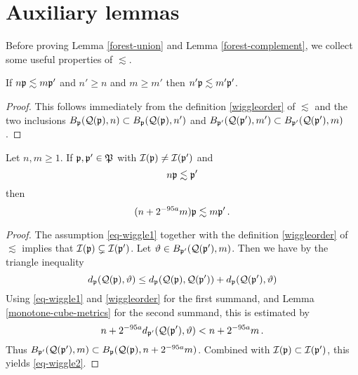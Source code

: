 {\section{Auxiliary lemmas}
\label{subsec-lessim-aux}
Before proving Lemma \ref{forest-union} and Lemma \ref{forest-complement}, we collect some useful properties of $\lesssim$.

\begin{lemma}
    \label{wiggle-order-1}

    If $n{\mathfrak p} \lesssim m{\mathfrak p}'$ and
    $n' \ge  n$ and $m \ge m'$ then $n'{\mathfrak p} \lesssim m'{\mathfrak p}'$.
\end{lemma}

\begin{proof}
    This follows immediately from the definition \eqref{wiggleorder} of $\lesssim$ and the two inclusions $B_{{\mathfrak p}}({\mathcal{Q}}({\mathfrak p}), n) \subset B_{{\mathfrak p}}({\mathcal{Q}}({\mathfrak p}), n')$ and $B_{{\mathfrak p}'}({\mathcal{Q}}({\mathfrak p}'), m') \subset B_{{\mathfrak p}'}({\mathcal{Q}}({\mathfrak p}'), m)$.
\end{proof}

\begin{lemma}
    \label{wiggle-order-2}

    Let $n, m \ge 1$.
    If ${\mathfrak p}, {\mathfrak p}' \in {\mathfrak P}$ with ${\mathcal{I}}({\mathfrak p}) \ne {\mathcal{I}}({\mathfrak p}')$ and
    \begin{equation}
        \label{eq-wiggle1}
        n {\mathfrak p} \lesssim {\mathfrak p}'
    \end{equation}
    then
    \begin{equation}
        \label{eq-wiggle2}
        (n + 2^{-95 a} m) {\mathfrak p} \lesssim m{\mathfrak p}'\,.
    \end{equation}
\end{lemma}

\begin{proof}
    The assumption \eqref{eq-wiggle1} together with the definition \eqref{wiggleorder} of $\lesssim$ implies that ${\mathcal{I}}({\mathfrak p}) \subsetneq {\mathcal{I}}({\mathfrak p}')$. Let ${\vartheta} \in B_{{\mathfrak p}'}({\mathcal{Q}}({\mathfrak p}'), m)$.  Then we have by the triangle inequality
    $$
        d_{{\mathfrak p}}({\mathcal{Q}}({\mathfrak p}), {\vartheta}) \le  d_{{\mathfrak p}}({\mathcal{Q}}({\mathfrak p}), {\mathcal{Q}}({\mathfrak p}')) +  d_{{\mathfrak p}}({\mathcal{Q}}({\mathfrak p}'), {\vartheta})
    $$
    Using \eqref{eq-wiggle1} and \eqref{wiggleorder} for the first summand, and Lemma \ref{monotone-cube-metrics} for the second summand, this is estimated by
    $$
        n + 2^{-95a} d_{{\mathfrak p}'}({\mathcal{Q}}({\mathfrak p}'), {\vartheta}) < n + 2^{-95a} m\,.
    $$
    Thus $B_{{\mathfrak p}'}({\mathcal{Q}}({\mathfrak p}'),m) \subset B_{{\mathfrak p}}({\mathcal{Q}}({\mathfrak p}),n + 2^{-95a}m)$. Combined with ${\mathcal{I}}({\mathfrak p}) \subset {\mathcal{I}}({\mathfrak p}')$, this yields \eqref{eq-wiggle2}.
\end{proof}

}
